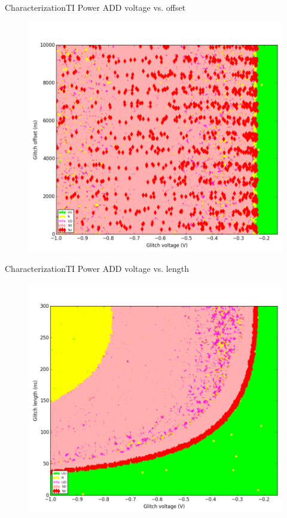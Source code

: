 \documentclass[table]{beamer}
\begin{document}

%     

\begin{frame}{Characterization}{TI Power ADD voltage vs. offset}
    \vspace{-.3cm}
    \begin{figure}[H]
      \centering
      \includegraphics[width=.7\textwidth]{../../plots/newplots/ti-add-voltage-offset.png}
    \end{figure}
\end{frame}

\begin{frame}{Characterization}{TI Power ADD voltage vs. length}
    \vspace{-.3cm}
    \begin{figure}[H]
      \centering
      \includegraphics[width=.7\textwidth]{../../plots/newplots/ti-add-voltage-length.png}
    \end{figure}
\end{frame}
\end{document}
